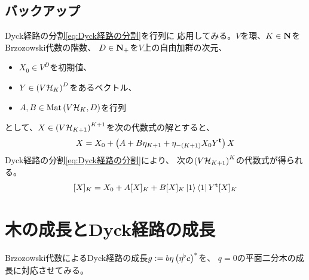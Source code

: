 {\subsection{バックアップ}\label{s2:バックアップ} %
	Dyck経路の分割\ref{eq:Dyck経路の分割}を行列に
	応用してみる。$V$を環、$K\in\mathbf{N}$をBrzozowski代数の階数、
	$D\in\mathbf{N}_+$を$V$上の自由加群の次元、
	\begin{itemize}\setlength{\itemsep}{-1mm} %
		\item $X_0\in V^D$を初期値、
		\item $Y\in\mathinner{\left({V{\ensuremath{{\mathcal{H}}}}_K}\right)}^D$をあるベクトル、
		\item $A,B\in{\ensuremath{\operatorname{Mat}}}\mathinner{\left({V{\ensuremath{{\mathcal{H}}}}_K,D}\right)}$を行列
	\end{itemize} %
	として、$X\in\mathinner{\left({V{\ensuremath{{\mathcal{H}}}}_{K+1}}\right)}^{K+1}$を次の代数式の解とすると、
	\begin{equation*}\begin{split}
		X = X_0 + \mathinner{\left({A + B\eta_{K+1} + \eta_{-\mathinner{\left({K+1}\right)}}X_0Y^{\mathbf{t}}}\right)}X
	\end{split}\end{equation*}
	Dyck経路の分割\ref{eq:Dyck経路の分割}により、
	次の$\mathinner{\left({V{\ensuremath{{\mathcal{H}}}}_{K+1}}\right)}^{K}$の代数式が得られる。
	\begin{equation*}\begin{split}
		[X]_K = X_0 + A[X]_K + B[X]_K\mathinner{|{1}\rangle}\mathinner{\langle{1}|}Y^{\mathbf{t}}[X]_K
	\end{split}\end{equation*}
\section{木の成長とDyck経路の成長}\label{s1:木の成長とDyck経路の成長} %
	Brzozowski代数によるDyck経路の成長$g:=b\eta\mathinner{\left({\eta^\flat c}\right)}^*$を、
	$q=0$の平面二分木の成長に対応させてみる。

}

